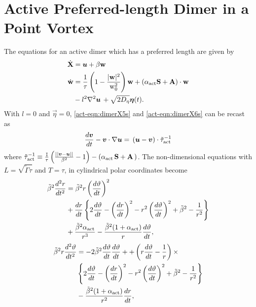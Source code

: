 \documentclass[../Rajarshi-thesis-draft.tex]{subfiles}
\begin{document}
\section{Active Preferred-length Dimer in a Point Vortex}
\label{act-ABPvortex}
The equations for an active dimer which has a preferred length are given by
\begin{align}
\dot{\mathbf{X}} & =  \vec{u} + \beta \mathbf{w}%
\label{act-eqn:dimerX5s}\\
\dot{\mathbf{w}} & = \frac{1}{\tau}\left(1 - \frac{|\mathbf{w}|^2}{\mathrm{w}_{0}^{2}} \right)   \mathbf{w} + (\alpha_{\rm act} \mathbf{S} + \mathbf{A})\cdot\mathbf{w} \nonumber \\ & - {l}^{2} \nabla^{2} \vec{u} \, %
+ \sqrt{2D_\eta}\vec{\eta}(t). \label{act-eqn:dimerX6s}%
\end{align}
With $l = 0$ and $\vec{\eta} =0$,  \eqref{act-eqn:dimerX5s} and \eqref{act-eqn:dimerX6s} can be recast as
\begin{equation}
\frac{d \vec{v}}{dt} - \vec{v}\cdot\nabla \vec{u} = \,(\vec{u} - \vec{v}) \cdot \tilde{\tau}_{\rm act}^{-1}
\label{act-eqn:36}
\end{equation}
where $\tilde{\tau}_{\rm act}^{-1} \equiv \frac{\mathbb{I}}{\tau} \left(\frac{||\vec{v}-\vec{u}||}{\beta^{2}} - 1 \right) - ( \alpha_{\rm act} \, \mathbf{S} + \mathbf{A} \,)$. The non-dimensional equations with $L = \sqrt{\tilde{\Gamma} \tau}$ and $T = \tau$, in cylindrical polar coordinates become
\begin{align}
\tilde{\beta}^2 \frac{d^{2} r}{dt^{2}} & = \tilde{\beta}^2 r \left( \frac{d\vartheta}{dt}\right)^{2} \nonumber \\
& + \frac{dr}{dt} \left\{ 2\frac{d\vartheta}{dt} -  \left( \frac{dr}{dt}\right)^{2} -r^{2} \left( \frac{d\vartheta}{dt}\right)^{2} + \tilde{\beta}^2 - \frac{1}{r^{2}} \right\} \nonumber \\
& + \frac{\tilde{\beta}^2 \alpha_{\rm act}}{ r^{3}}  - \frac{\tilde{\beta}^2 (1+\alpha_{\rm act})}{ r} \frac{d\vartheta}{dt},
\end{align}
\begin{align}
\tilde{\beta}^2 r \frac{d^{2} \vartheta}{dt^{2}} & = - 2 \tilde{\beta}^2 \frac{d\vartheta}{dt}\frac{d\vartheta}{dt}  + + \left( r \frac{d\vartheta}{dt} - \frac{1}{r} \right) \times \nonumber \\
& \left\{ 2\frac{d\vartheta}{dt} -  \left( \frac{dr}{dt}\right)^{2} -r^{2} \left( \frac{d\vartheta}{dt}\right)^{2} + \tilde{\beta}^2 - \frac{1}{r^{2}} \right\} \nonumber \\
& - \frac{\tilde{\beta}^2 (1+\alpha_{\rm act})}{ r^{2}} \frac{dr}{dt},
\end{align}
\end{document}
